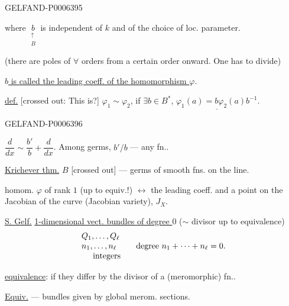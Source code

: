\begin{GelfandAdjacentEvidence}{GELFAND-P000639}{5}


where \(\underset{\substack{\uparrow\\ B}}{b}\) is independent of \(k\)
and of the choice of loc. parameter.

(there are poles of \(\forall\) orders from a certain order onward. One has to divide)

\underline{\(b\) is called the leading coeff. of the homomorphism \(\varphi\)}.

\underline{def.} [crossed out: This is?] \(\varphi_1\sim\varphi_2\),
if \(\exists b\in B^*\),
\(\underline{\varphi_1(a)=b\varphi_2(a)b^{-1}}\).
\end{GelfandAdjacentEvidence}
\begin{GelfandAdjacentEvidence}{GELFAND-P000639}{6}


\(\dfrac{d}{dx}\sim\dfrac{b'}{b}+\dfrac{d}{dx}\).
Among germs, \(b'/b\) --- any fn..

\underline{Krichever thm.}
\(B\) [crossed out] --- germs of smooth fns. on the line.
\end{GelfandAdjacentEvidence}


homom. \(\varphi\) of rank \(1\) (up to equiv.!)
\(\longleftrightarrow\) the leading coeff. and a point on the Jacobian of the curve
(Jacobian variety), \(J_X\).

\underline{S. Gelf.}
\underline{1-dimensional vect. bundles of degree \(0\)}
(\(\sim\) divisor up to equivalence)
\[
\begin{array}{l@{\qquad}l}
Q_1,\ldots,Q_\ell & \\
n_1,\ldots,n_\ell & \text{degree } n_1+\cdots+n_\ell=0.\\
\multicolumn{1}{c}{\text{integers}} &
\end{array}
\]

\underline{equivalence}: if they differ by the divisor of a (meromorphic) fn..

\underline{Equiv.} --- bundles given by global merom. sections.


